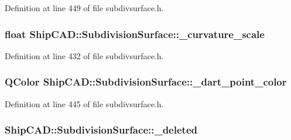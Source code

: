 Definition at line 449 of file subdivsurface.\+h.

\subsubsection[{\texorpdfstring{\+\_\+curvature\+\_\+scale}{_curvature_scale}}]{\setlength{\rightskip}{0pt plus 5cm}float Ship\+C\+A\+D\+::\+Subdivision\+Surface\+::\+\_\+curvature\+\_\+scale\hspace{0.3cm}{\ttfamily [protected]}}\hypertarget{classShipCAD_1_1SubdivisionSurface_acf241b41a8ca897306decbbab8e44c69}{}\label{classShipCAD_1_1SubdivisionSurface_acf241b41a8ca897306decbbab8e44c69}


Definition at line 432 of file subdivsurface.\+h.

\subsubsection[{\texorpdfstring{\+\_\+dart\+\_\+point\+\_\+color}{_dart_point_color}}]{\setlength{\rightskip}{0pt plus 5cm}Q\+Color Ship\+C\+A\+D\+::\+Subdivision\+Surface\+::\+\_\+dart\+\_\+point\+\_\+color\hspace{0.3cm}{\ttfamily [protected]}}\hypertarget{classShipCAD_1_1SubdivisionSurface_a45054fd2d0065a342828bcd675e91307}{}\label{classShipCAD_1_1SubdivisionSurface_a45054fd2d0065a342828bcd675e91307}


Definition at line 445 of file subdivsurface.\+h.

\subsubsection[{\texorpdfstring{\+\_\+deleted}{_deleted}}]{ Ship\+C\+A\+D\+::\+Subdivision\+Surface\+::\+\_\+deleted\hspace{0.3cm}{\ttfamily [protected]}}\hypertarget{classShipCAD_1_1SubdivisionSurface_a7ffa4a7be62b7e5931dd70fce9c885ee}{}\label{classShipCAD_1_1SubdivisionSurface_a7ffa4a7be62b7e5931dd70fce9c885ee}


